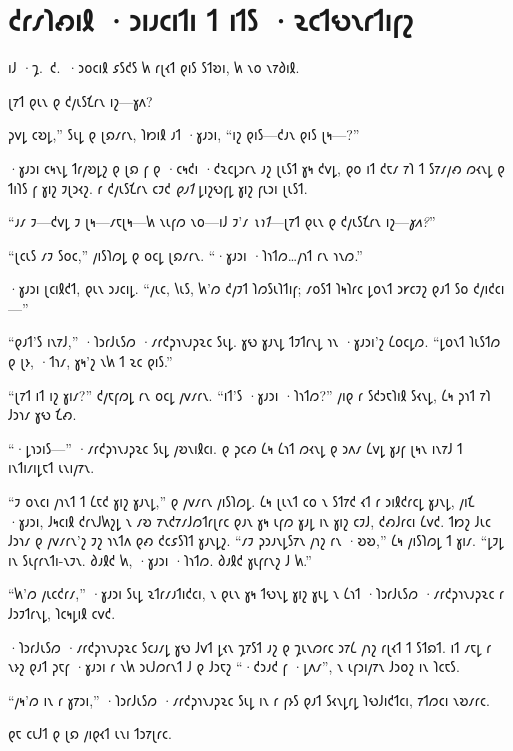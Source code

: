 \chapter{𐑒𐑩𐑥𐑐𐑺𐑦𐑙 ·𐑮𐑦𐑨𐑤𐑦𐑑𐑦 𐑑 𐑦𐑑𐑕 ·𐑷𐑤𐑑𐑻𐑯𐑩𐑑𐑦𐑝𐑟}

\begin{chapterOpeningAuthorNote}
𐑦𐑓 ·𐑡.~𐑒.~·𐑮𐑴𐑤𐑦𐑙 𐑭𐑕𐑒𐑕 𐑿 𐑩𐑚𐑬𐑑 𐑞𐑦𐑕 𐑕𐑑𐑹𐑦, 𐑿 𐑯𐑴 𐑯𐑳𐑔𐑦𐑙.
\end{chapterOpeningAuthorNote}
\begin{chapterOpeningQuote}
𐑚𐑳𐑑 𐑞𐑧𐑯 𐑞 𐑒𐑢𐑧𐑕𐑗𐑩𐑯 𐑦𐑟—𐑣𐑵?
\end{chapterOpeningQuote}

𐑜𐑫𐑛 𐑤𐑹𐑛,” 𐑕𐑧𐑛 𐑞 𐑚𐑸𐑥𐑩𐑯, 𐑐𐑽𐑦𐑙 𐑨𐑑 ·𐑣𐑨𐑮𐑦, “𐑦𐑟 𐑞𐑦𐑕—𐑒𐑨𐑯 𐑞𐑦𐑕 𐑚𐑰—?”

·𐑣𐑨𐑮𐑦 𐑤𐑰𐑯𐑛 𐑑𐑩𐑢𐑹𐑛𐑟 𐑞 𐑚𐑸 𐑝 𐑞 ·𐑤𐑰𐑒𐑦 ·𐑒𐑷𐑤𐑛𐑮𐑩𐑯 𐑨𐑟 𐑚𐑧𐑕𐑑 𐑣𐑰 𐑒𐑫𐑛, 𐑞𐑴 𐑦𐑑 𐑒𐑱𐑥 𐑳𐑐 𐑑 𐑕𐑳𐑥𐑢𐑺 𐑼𐑬𐑯𐑛 𐑞 𐑑𐑦𐑐𐑕 𐑝 𐑣𐑦𐑟 𐑲𐑚𐑮𐑬𐑟. 𐑩 𐑒𐑢𐑧𐑕𐑗𐑩𐑯 𐑤𐑲𐑒 \emph{𐑞𐑨𐑑} 𐑛𐑦𐑟𐑻𐑝𐑛 𐑣𐑦𐑟 𐑝𐑧𐑮𐑦 𐑚𐑧𐑕𐑑.

“𐑨𐑥 𐑲—𐑒𐑫𐑛 𐑲 𐑚𐑰—𐑥𐑱𐑚𐑰—𐑿 𐑯𐑧𐑝𐑼 𐑯𐑴—𐑦𐑓 𐑲'𐑥 \emph{𐑯𐑪𐑑}—𐑚𐑳𐑑 𐑞𐑧𐑯 𐑞 𐑒𐑢𐑧𐑕𐑗𐑩𐑯 𐑦𐑟—\emph{𐑣𐑵?}”

“𐑚𐑤𐑧𐑕 𐑥𐑲 𐑕𐑴𐑤,” 𐑢𐑦𐑕𐑐𐑼𐑛 𐑞 𐑴𐑤𐑛 𐑚𐑸𐑥𐑩𐑯. “·𐑣𐑨𐑮𐑦 ·𐑐𐑪𐑑𐑼…𐑢𐑪𐑑 𐑩𐑯 𐑪𐑯𐑼.”

·𐑣𐑨𐑮𐑦 𐑚𐑤𐑦𐑙𐑒𐑑, 𐑞𐑧𐑯 𐑮𐑨𐑤𐑦𐑛. “𐑢𐑧𐑤, 𐑘𐑧𐑕, 𐑿'𐑼 𐑒𐑢𐑲𐑑 𐑐𐑼𐑕𐑧𐑐𐑑𐑦𐑝; 𐑥𐑴𐑕𐑑 𐑐𐑰𐑐𐑩𐑤 𐑛𐑴𐑯𐑑 𐑮𐑾𐑤𐑲𐑟 𐑞𐑨𐑑 𐑕𐑴 𐑒𐑢𐑦𐑒𐑤𐑦—”

“𐑞𐑨𐑑'𐑕 𐑦𐑯𐑳𐑓,” ·𐑐𐑮𐑩𐑓𐑧𐑕𐑼 ·𐑥𐑩𐑒𐑜𐑪𐑯𐑨𐑜𐑷𐑤 𐑕𐑧𐑛. 𐑣𐑻 𐑣𐑨𐑯𐑛 𐑑𐑲𐑑𐑩𐑯𐑛 𐑪𐑯 ·𐑣𐑨𐑮𐑦'𐑟 𐑖𐑴𐑤𐑛𐑼. “𐑛𐑴𐑯𐑑 𐑐𐑧𐑕𐑑𐑼 𐑞 𐑚𐑶, ·𐑑𐑪𐑥, 𐑣𐑰'𐑟 𐑯𐑿 𐑑 𐑷𐑤 𐑞𐑦𐑕.”

“𐑚𐑳𐑑 𐑦𐑑 𐑦𐑟 𐑣𐑦𐑥?” 𐑒𐑢𐑱𐑝𐑼𐑛 𐑩𐑯 𐑴𐑤𐑛 𐑢𐑫𐑥𐑩𐑯. “𐑦𐑑'𐑕 ·𐑣𐑨𐑮𐑦 ·𐑐𐑪𐑑𐑼?” 𐑢𐑦𐑞 𐑩 𐑕𐑒𐑮𐑱𐑐𐑦𐑙 𐑕𐑬𐑯𐑛, 𐑖𐑰 𐑜𐑪𐑑 𐑳𐑐 𐑓𐑮𐑪𐑥 𐑣𐑻 𐑗𐑺.

“·𐑛𐑪𐑮𐑦𐑕—” ·𐑥𐑩𐑒𐑜𐑪𐑯𐑨𐑜𐑷𐑤 𐑕𐑧𐑛 𐑢𐑹𐑯𐑦𐑙𐑤𐑦. 𐑞 𐑜𐑤𐑺 𐑖𐑰 𐑖𐑪𐑑 𐑼𐑬𐑯𐑛 𐑞 𐑮𐑵𐑥 𐑖𐑫𐑛 𐑣𐑨𐑝 𐑚𐑰𐑯 𐑦𐑯𐑳𐑓 𐑑 𐑦𐑯𐑑𐑦𐑥𐑦𐑛𐑱𐑑 𐑧𐑯𐑦𐑢𐑳𐑯.

“𐑲 𐑴𐑯𐑤𐑦 𐑢𐑪𐑯𐑑 𐑑 𐑖𐑱𐑒 𐑣𐑦𐑟 𐑣𐑨𐑯𐑛,” 𐑞 𐑢𐑫𐑥𐑩𐑯 𐑢𐑦𐑕𐑐𐑼𐑛. 𐑖𐑰 𐑚𐑧𐑯𐑑 𐑤𐑴 𐑯 𐑕𐑑𐑳𐑒 𐑬𐑑 𐑩 𐑮𐑦𐑙𐑒𐑩𐑤𐑛 𐑣𐑨𐑯𐑛, 𐑢𐑦𐑗 ·𐑣𐑨𐑮𐑦, 𐑓𐑰𐑤𐑦𐑙 𐑒𐑩𐑯𐑓𐑿𐑟𐑛 𐑯 𐑥𐑹 𐑳𐑯𐑒𐑳𐑥𐑓𐑼𐑑𐑩𐑚𐑩𐑤 𐑞𐑨𐑯 𐑣𐑰 𐑧𐑝𐑼 𐑣𐑨𐑛 𐑦𐑯 𐑣𐑦𐑟 𐑤𐑲𐑓, 𐑒𐑺𐑓𐑩𐑤𐑦 𐑖𐑫𐑒. 𐑑𐑽𐑟 𐑓𐑧𐑤 𐑓𐑮𐑪𐑥 𐑞 𐑢𐑫𐑥𐑩𐑯'𐑟 𐑲𐑟 𐑪𐑯𐑑𐑵 𐑞𐑺 𐑒𐑤𐑭𐑕𐑐𐑑 𐑣𐑨𐑯𐑛𐑟. “𐑥𐑲 𐑜𐑮𐑨𐑯𐑛𐑕𐑳𐑯 𐑢𐑪𐑟 𐑩𐑯 ·𐑹𐑹,” 𐑖𐑰 𐑢𐑦𐑕𐑐𐑼𐑛 𐑑 𐑣𐑦𐑥. “𐑛𐑲𐑛 𐑦𐑯 𐑕𐑧𐑝𐑩𐑯𐑑𐑦-𐑯𐑲𐑯. 𐑔𐑨𐑙𐑒 𐑿, ·𐑣𐑨𐑮𐑦 ·𐑐𐑪𐑑𐑼. 𐑔𐑨𐑙𐑒 𐑣𐑧𐑝𐑩𐑯𐑟 𐑓 𐑿.”

“𐑿'𐑼 𐑢𐑧𐑤𐑒𐑩𐑥,” ·𐑣𐑨𐑮𐑦 𐑕𐑧𐑛 𐑷𐑑𐑩𐑥𐑨𐑑𐑦𐑒𐑤𐑦, 𐑯 𐑞𐑧𐑯 𐑣𐑰 𐑑𐑻𐑯𐑛 𐑣𐑦𐑟 𐑣𐑧𐑛 𐑯 𐑖𐑪𐑑 ·𐑐𐑮𐑩𐑓𐑧𐑕𐑼 ·𐑥𐑩𐑒𐑜𐑪𐑯𐑨𐑜𐑷𐑤 𐑩 𐑓𐑮𐑲𐑑𐑩𐑯𐑛, 𐑐𐑤𐑰𐑛𐑦𐑙 𐑤𐑫𐑒.

·𐑐𐑮𐑩𐑓𐑧𐑕𐑼 ·𐑥𐑩𐑒𐑜𐑪𐑯𐑨𐑜𐑷𐑤 𐑕𐑤𐑨𐑥𐑛 𐑣𐑻 𐑓𐑫𐑑 𐑛𐑬𐑯 𐑡𐑳𐑕𐑑 𐑨𐑟 𐑞 𐑡𐑧𐑯𐑼𐑩𐑤 𐑮𐑳𐑖 𐑢𐑪𐑟 𐑩𐑚𐑬𐑑 𐑑 𐑕𐑑𐑸𐑑. 𐑦𐑑 𐑥𐑱𐑛 𐑩 𐑯𐑶𐑟 𐑞𐑨𐑑 𐑜𐑱𐑝 ·𐑣𐑨𐑮𐑦 𐑩 𐑯𐑿 𐑮𐑧𐑓𐑼𐑩𐑯𐑑 𐑓 𐑞 𐑓𐑮𐑱𐑟 “·𐑒𐑮𐑨𐑒 𐑝 ·𐑛𐑵𐑥”, 𐑯 𐑧𐑝𐑮𐑦𐑢𐑳𐑯 𐑓𐑮𐑴𐑟 𐑦𐑯 𐑐𐑤𐑱𐑕.

“𐑢𐑰'𐑼 𐑦𐑯 𐑩 𐑣𐑳𐑮𐑦,” ·𐑐𐑮𐑩𐑓𐑧𐑕𐑼 ·𐑥𐑩𐑒𐑜𐑪𐑯𐑨𐑜𐑷𐑤 𐑕𐑧𐑛 𐑦𐑯 𐑩 𐑝𐑶𐑕 𐑞𐑨𐑑 𐑕𐑬𐑯𐑛𐑩𐑛 𐑐𐑻𐑓𐑦𐑒𐑑𐑤𐑦, 𐑳𐑑𐑼𐑤𐑦 𐑯𐑹𐑥𐑩𐑤.

𐑞𐑱 𐑤𐑧𐑓𐑑 𐑞 𐑚𐑸 𐑢𐑦𐑞𐑬𐑑 𐑧𐑯𐑦 𐑑𐑮𐑳𐑚𐑩𐑤.

